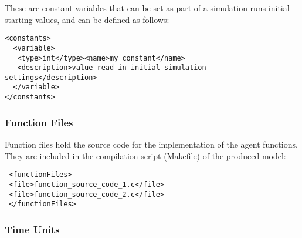 These are constant variables that can be set as part of a simulation runs
initial starting values, and can be defined as follows:

\begin{mylisting}
\begin{verbatim}
<constants>
  <variable>
   <type>int</type><name>my_constant</name>
   <description>value read in initial simulation settings</description>
  </variable>
</constants>
\end{verbatim}
\end{mylisting}

% 
% 
% 

\subsubsection{Function Files}

Function files hold the source code for the implementation of the
agent functions.
They are included in the compilation script (Makefile) of the produced model:

\begin{mylisting}
\begin{verbatim}
 <functionFiles>
 <file>function_source_code_1.c</file>
 <file>function_source_code_2.c</file>
 </functionFiles>
\end{verbatim}
\end{mylisting}

\subsubsection{Time Units}
\label{timeunit}


